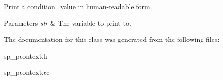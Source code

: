 Print a condition\+\_\+value in human-\/readable form.


\begin{DoxyParams}{Parameters}
{\em str} & The variable to print to. \\
\hline
\end{DoxyParams}


The documentation for this class was generated from the following files\+:\begin{DoxyCompactItemize}
\item 
sp\+\_\+pcontext.\+h\item 
sp\+\_\+pcontext.\+cc\end{DoxyCompactItemize}
